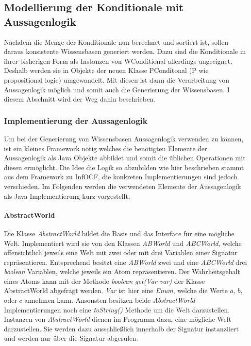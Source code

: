 \documentclass[12pt,a4paper]{article}
\begin{document}
\subsection{Modellierung der Konditionale mit Aussagenlogik}
Nachdem die Menge der Konditionale nun berechnet und sortiert ist, sollen daraus konsistente Wissensbasen generiert werden. Dazu sind die Konditionale in ihrer bisherigen Form als Instanzen von WConditional allerdings ungeeignet. Deshalb werden sie in Objekte der neuen Klasse PConditonal (P wie propositional logic) umgewandelt. Mit diesen ist dann die Verarbeitung von Aussagenlogik möglich und somit auch die Generierung der Wissensbasen. I diesem Abschnitt wird der Weg dahin beschrieben.




\subsubsection{Implementierung der Aussagenlogik}
\label{sec:logic}

Um bei der Generierung von Wissensbasen Aussagenlogik verwenden zu können, ist ein kleines Framework nötig welches die benötigten Elemente der Aussagenlogik als Java Objekte abbildet und somit die üblichen Operationen mit diesen ermöglicht. Die Idee die Logik so abzubilden wie hier  beschrieben stammt aus dem Framework zu InfOCF, die konkreten Implementierungen sind jedoch verschieden. Im Folgenden werden die verwendeten Elemente der Aussagenlogik als Java Implementierung kurz vorgestellt.



\paragraph{AbstractWorld} \mbox{}

Die Klasse \textit{AbstractWorld} bildet die Basis und das Interface für eine mögliche Welt. Implementiert wird sie von den Klassen \textit{ABWorld} und \textit{ABCWorld}, welche offensichtlich jeweils eine Welt mit zwei oder mit drei Variablen einer Signatur repräsentieren. Entsprechend besitzt eine \textit{ABWorld} zwei und eine \textit{ABCWorld} drei \textit{boolean} Variablen, welche jeweils ein Atom repräsentieren. Der Wahrheitsgehalt eines Atoms kann mit der Methode \textit{boolean get(Var var)} der Klasse AbstractWorld abgefragt werden. \textit{Var} ist hier eine \textit{Enum}, welche die Werte $a$, $b$, oder $c$ annehmen kann. Ansonsten besitzen beide \textit{AbstractWorld} Implementierungen noch eine \textit{toString()} Methode um die Welt darzustellen. \\
Instanzen von \textit{AbstractWorld} dienen im Programm dazu, eine mögliche Welt darzustellen. Sie werden dazu  ausschließlich innerhalb der Signatur instanziiert und werden nur über die Signatur abgerufen.
\end{document}
